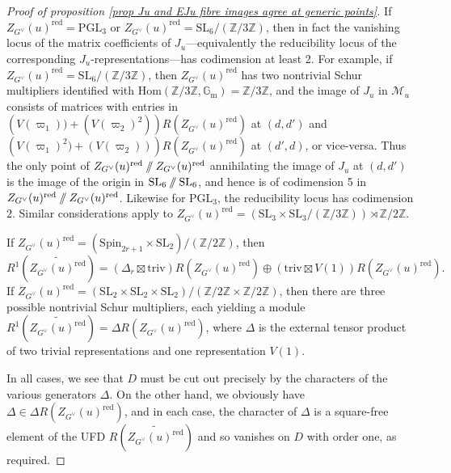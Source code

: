 \documentclass[10pt]{article}
\newcommand{\Hom}[2]{\mathrm{Hom}(#1, #2)}
\newcommand{\git}{\mathbin{
  \mathchoice{/\mkern-6mu/}%
    {/\mkern-6mu/}%
    {/\mkern-5mu/}%
    {/\mkern-5mu/}}}%
\newcommand{\Z}{\mathbb{Z}}
\newcommand{\PGL}{\mathrm{PGL}}
\newcommand{\SL}{\mathrm{SL}}
\newcommand{\Spin}{\mathrm{Spin}}
\newcommand{\Gm}{{\mathbb{G}_\mathrm{m}}}
\newcommand{\triv}{\mathrm{triv}}
\theoremstyle{definition}
\theoremstyle{remark}
\newcommand{\Zur}{Z_{G^\vee}(u)^{\mathrm{red}}}
\newcommand{\mMu}{\mathcal{M}_u}
\begin{document}
\begin{proof}[Proof of proposition \ref{prop Ju and EJu fibre images agree at generic points}]
If $\Zur=\PGL_3$ or $\Zur=\SL_6/(\Z/3\Z)$, then in fact the vanishing locus of the matrix coefficients 
of $J_u$---equivalently the reducibility locus of the corresponding $J_u$-representations---has 
codimension at least 2. For example, if $\Zur=\SL_6/(\Z/3\Z)$, then $\Zur$ has two nontrivial Schur multipliers 
identified with $\Hom{\Z/3\Z}{\Gm}=\Z/3\Z$, and the image of $J_u$ in $\mMu$ consists of 
matrices with entries in $\left(V(\varpi_1))+(V(\varpi_2)^2)\right)R(\Zur)$
at $(d,d')$ and $\left(V(\varpi_1)^2)+(V(\varpi_2))\right)R(\Zur)$
at $(d',d)$, or vice-versa. Thus the only point of $\Zur\git\Zur$ annihilating the image of $J_u$
at $(d,d')$ is the image of the origin in $\SL_6\git\SL_6$, and hence is of codimension 5 in
$\Zur\git\Zur$. Likewise for $\PGL_3$, the reducibility locus has codimension $2$. 
Similar considerations apply to 
$\Zur=\left(\SL_3\times\SL_3/(\Z/3\Z)\right)\rtimes\Z/2\Z$.

If $\Zur=(\Spin_{2r+1}\times\SL_2)/(\Z/2\Z)$, then 
%
\[
R^1(\widetilde{\Zur})=(\Delta_r\boxtimes\triv)R(\Zur)\oplus(\triv\boxtimes V(1))R(\Zur).
\]
%
If $\Zur=(\SL_2\times\SL_2\times\SL_2)/(\Z/2\Z\times\Z/2\Z)$, then there are three possible nontrivial
Schur multipliers, each yielding a module $R^1(\widetilde{\Zur})=\Delta R(\Zur)$, where $\Delta$
is the external tensor product of two trivial representations and one representation $V(1)$.

In all cases, we see that $D$ must be cut out precisely by the characters of the various generators $\Delta$. 
On the other hand, we obviously have $\Delta\in\Delta R(\Zur)$, and in each case,
the character of $\Delta$ is a square-free element of the UFD $R(\widetilde{\Zur})$ and so vanishes on
$D$ with order one, as required. 


\end{proof}
\end{document}
